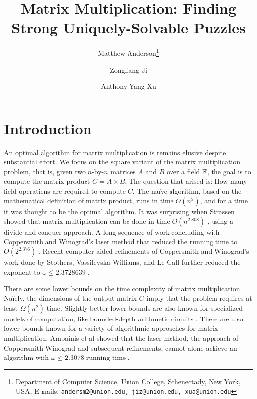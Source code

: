 \documentclass[11pt]{article}
\date{}
\title{Matrix Multiplication: Finding Strong Uniquely-Solvable Puzzles
{\IfFileExists{./sha.tex}{\\\small SHA: }{}}}
\author{
Matthew Anderson\thanks{Department of Computer Science, Union College, Schenectady, New York, USA, E-mails: \texttt{andersm2@union.edu, jiz@union.edu, xua@union.edu}}%
\and%
Zongliang Ji\samethanks[1]
\and%
Anthony Yang Xu\samethanks[1]
}
\begin{document}
\maketitle

\begin{abstract}

\end{abstract}

\thispagestyle{empty}
\newpage
{}


\section{Introduction}
\label{sec:intro}


An optimal algorithm for matrix multiplication is remains elusive
despite substantial effort.  We focus on the square variant of the
matrix multiplication problem, that is, given two $n$-by-$n$ matrices
$A$ and $B$ over a field $\F$, the goal is to compute the matrix
product $C = A \times B$.  The question that arised is: How many field
operations are required to compute $C$.  The na\"{i}ve algorithm,
based on the mathematical definition of matrix product, runs in time
$O(n^3)$, and for a time it was thought to be the optimal algorithm.
It was surprising when Strassen showed that matrix multiplication can
be done in time $O(n^{2.808})$ \cite{str69}, using a
divide-and-conquer approach.  A long sequence of work concluding with
Coppersmith and Winograd's laser method that reduced the running time
to $O(2^{2.376})$ \cite{pan78,b79,sch81,cw82,str86,cw87}. Recent
computer-aided refinements of Coppersmith and Winograd's work done by
Stothers, Vassilevska-Williams, and Le Gall further reduced the
exponent to $\omega \le 2.3728639$ \cite{sto10,vas11,leg14}.

There are some lower bounds on the time complexity of matrix
multiplication.  Na\"{i}ely, the dimensions of the output matrix $C$
imply that the problem requires at least $\Omega(n^2)$ time.  Slightly
better lower bounds are also known for specialized models of
computation, like bounded-depth arithmetic circuits \cite{XXX}.  There
are also lower bounds known for a variety of algorithmic approaches
for matrix multiplication.  Ambainis et al showed that the laser
method, the approach of Coppersmith-Winograd and subsequent
refinements, cannot alone achieve an algorithm with $\omega \le
2.3078$ running time \cite{afl14}.

\end{document}
